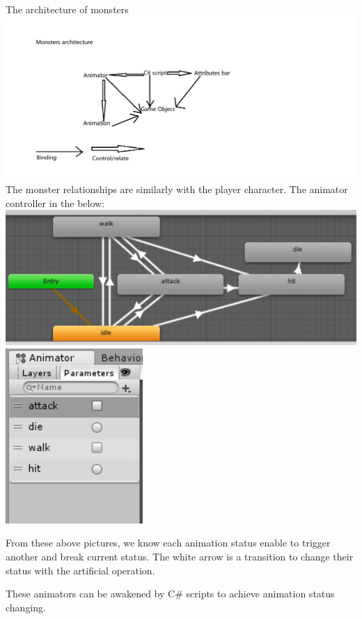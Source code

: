The architecture of monsters\\
\includegraphics[scale=0.5]{img/ArchitectureOfMonster.png}\\
The monster relationships are similarly with the player character.
The animator controller in the below:\\
\includegraphics[scale=0.5]{img/MonsterAinmator.png}\\
\includegraphics[scale=0.5]{img/MonsterP.png}\\
\item From these above pictures, we know each animation status enable to trigger another and break current status. The white arrow is a transition to change their status with the artificial operation.
\item These animators can be awakened by C\# scripts to achieve animation status changing.


